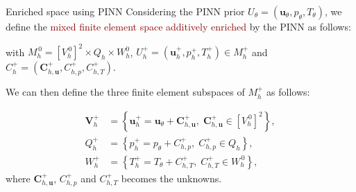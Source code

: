 \begin{frame}{Enriched space using PINN} %
    Considering the PINN prior $U_\theta = (\bm{u}_\theta, p_\theta, T_\theta)$, we define the \textcolor{darkred}{mixed finite element space additively enriched} by the PINN as follows:
    
    \begin{center}
    \end{center}

    with $M_h^{\, 0}=[V_h^{\, 0}]^2 \times Q_h \times W_h^0$,
    $U_h^+ = (\bm{u}_h^+, p_h^+, T_h^+) \in M_h^+$ and $C_h^+ = (\bm{C}_{h,\bm{u}}^+, C_{h,p}^+, C_{h,T}^+)$.

    \vspace{8pt}

    We can then define the three finite element subspaces of $M_h^+$ as follows:
    \begin{minipage}{0.6\linewidth}
        \vspace{-15pt}
        \begin{align*}
            \bm{V}_h^+ &= \left\{\bm{u}_h^+ = \bm{u}_\theta + \bm{C}_{h,\bm{u}}^+, \; \bm{C}_{h,\bm{u}}^+ \in [V_h^{\, 0}]^2\right\}, \\
            Q_h^+ &= \left\{p_h^+ = p_\theta + C_{h,p}^+, \; C_{h,p}^+ \in Q_h\right\}, \\
            W_h^+ &= \left\{T_h^+ = T_\theta + C_{h,T}^+, \; C_{h,T}^+ \in W_h^{\, 0}\right\},
        \end{align*}
        where $\bm{C}_{h,\bm{u}}^+$, $C_{h,p}^+$ and $C_{h,T}^+$ becomes the unknowns.
        
    \end{minipage}
    \begin{minipage}{0.38\linewidth}
        \centering
        \vspace{5pt}
    \end{minipage}
\end{frame}


